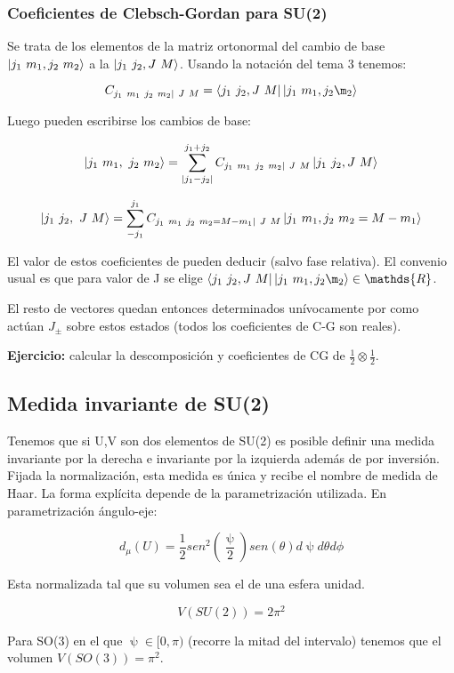 \documentclass{article}
\begin{document}
\subsubsection{Coeficientes de Clebsch-Gordan para SU(2)}

Se trata de los elementos de la matriz ortonormal del cambio de base $\ket{j_1 \ m_1,j_2 \ m_2}$ a la $\ket{j_1 \ j_2, J \ M}$. Usando la notación del tema 3 tenemos:

$$C_{j_1 \ m_1 \ j_2 \ m_2 | \ J \ M}=\bra{j_1 \ j_2 , J \ M}\ket{j_1 \ m_1, j_2 \m_2}$$

Luego pueden escribirse los cambios de base:

$$\ket{j_1 \ m_1, \ j_2 \ m_2}=\sum _{|j_1-j_2|}^{j_1+j_2} C_{j_1 \ m_1 \ j_2 \ m_2 | \ J \ M} \ket{j_1 \ j_2 , J \ M}$$

$$\ket{j_1 \ j_2, \ J \ M}=\sum _{-j_1}^{j_1} C_{j_1 \ m_1 \ j_2 \ m_2=M-m_1 | \ J \ M} \ket{j_1 \ m_1 , j_2 \ m_2=M-m_1}$$

El valor de estos coeficientes de pueden deducir (salvo fase relativa). El convenio usual es que para valor de J se elige $\bra{j_1 \ j_2 , J \ M}\ket{j_1 \ m_1, j_2 \m_2} \in \mathds{R}$.

El resto de vectores quedan entonces determinados unívocamente por como actúan $J_\pm$ sobre estos estados (todos los coeficientes de C-G son reales).

\textbf{Ejercicio:} calcular la descomposición y coeficientes de CG de $\frac{1}{2}\otimes \frac{1}{2}$.

\subsection{Medida invariante de SU(2)}

Tenemos que si U,V son dos elementos de SU(2) es posible definir una medida invariante por la derecha e invariante por la izquierda además de por inversión. Fijada la normalización, esta medida es única y recibe el nombre de medida de Haar. La forma explícita depende de la parametrización utilizada. En parametrización ángulo-eje:

$$d_\mu (U)=\frac{1}{2}sen^2(\frac{\uppsi}{2})sen(\theta) d\uppsi d\theta d\phi$$

Esta normalizada tal que su volumen sea el de una esfera unidad.

$$V(SU(2))=2\pi ^2$$

Para SO(3) en el que $\uppsi \in [0,\pi )$ (recorre la mitad del intervalo) tenemos que el volumen $V(SO(3))=\pi ^2$.
\end{document}
